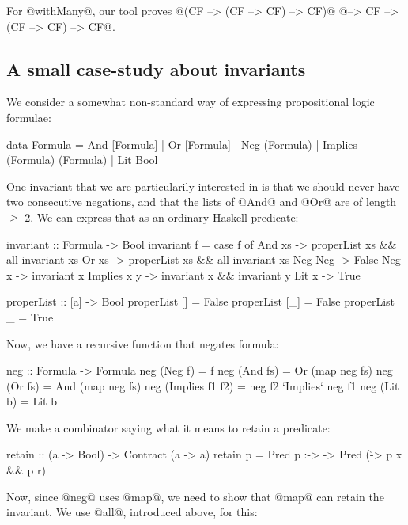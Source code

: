 For @withMany@, our tool proves
@(CF --> (CF --> CF) --> CF)@ @--> CF --> (CF --> CF) --> CF@.

\subsection{A small case-study about invariants}

We consider a somewhat non-standard way of expressing propositional
logic formulae:

\begin{code}
data Formula = And [Formula]
             | Or  [Formula]
             | Neg (Formula)
             | Implies (Formula) (Formula)
             | Lit Bool
\end{code}

One invariant that we are particularily interested in is that we
should never have two consecutive negations, and that the lists of
@And@ and @Or@ are of length $\ge$ 2. We can express that as an ordinary
Haskell predicate:

\begin{code}
invariant :: Formula -> Bool
invariant f = case f of
  And xs      -> properList xs && all invariant xs
  Or xs       -> properList xs && all invariant xs
  Neg Neg{}   -> False
  Neg x       -> invariant x
  Implies x y -> invariant x && invariant y
  Lit x       -> True

properList :: [a] -> Bool
properList []  = False
properList [_] = False
properList _   = True
\end{code}

Now, we have a recursive function that negates formula:

\begin{code}
neg :: Formula -> Formula
neg (Neg f)         = f
neg (And fs)        = Or (map neg fs)
neg (Or fs)         = And (map neg fs)
neg (Implies f1 f2) = neg f2 `Implies` neg f1
neg (Lit b)         = Lit b
\end{code}

We make a combinator saying what it means to retain a predicate:

\begin{code}
retain :: (a -> Bool) -> Contract (a -> a)
retain p = Pred p :-> \x -> Pred (\r -> p x && p r)
\end{code}

 Now, since @neg@ uses @map@, we need to show that
@map@ can retain the invariant. We use @all@, introduced above, for
this:

